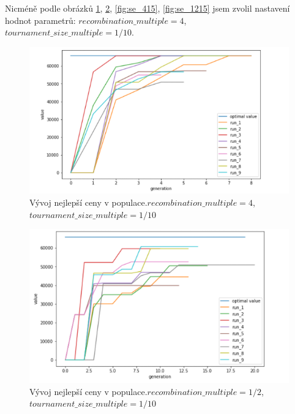 \documentclass{article}
\begin{document}
Nicméně podle obrázků \ref{fig:se_4110}, \ref{fig:se_12110}, \ref{fig:se_415}, \ref{fig:se_1215} jsem zvolil nastavení hodnot parametrů: \(recombination\_multiple=4\), \(tournament\_size\_multiple=1/10\).

\begin{figure}[H]
    \centering
    \includegraphics[width=1\textwidth]{screenshot_1286}
    \caption{Vývoj nejlepší ceny v populace.\newline \(recombination\_multiple=4\),\(tournament\_size\_multiple=1/10\)}
    \label{fig:se_4110}
\end{figure}

\begin{figure}[H]
    \centering
    \includegraphics[width=1\textwidth]{screenshot_1287}
    \caption{Vývoj nejlepší ceny v populace.\newline \(recombination\_multiple=1/2\),\(tournament\_size\_multiple=1/10\)}
    \label{fig:se_12110}
\end{figure}
\end{document}
